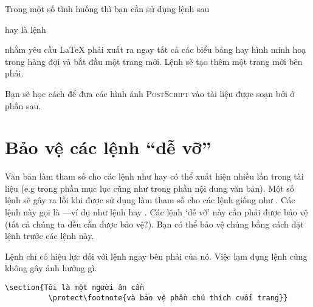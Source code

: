 Trong một số tình huống thì bạn cần sử dụng lệnh sau
\begin{lscommand}
 hay là lệnh 
\end{lscommand}
\noindent nhằm yêu cầu \LaTeX{} phải xuất ra ngay tất cả các biểu bảng hay hình minh hoạ trong hàng đợi và bắt đầu một trang mới. Lệnh  sẽ tạo thêm một trang mới bên phải.

Bạn sẽ học cách để đưa các hình ảnh \textsc{PostScript} vào tài liệu được soạn bởi \LaTeXe{} ở phần sau.

\section{Bảo vệ các lệnh ``dễ vỡ''}
Văn bản làm tham số cho các lệnh như  hay  có thể xuất hiện nhiều lần trong tài liệu (e.g trong phần mục lục cũng như trong phần nội dung văn bản). Một số lệnh sẽ gây ra lỗi khi được sử dụng làm tham số cho các lệnh giống như . Các lệnh này gọi là ---ví dụ như lệnh  hay . Các lệnh `dễ vỡ' này cần phải được bảo vệ (tất cả chúng ta đều cần được bảo vệ?). Bạn có thể bảo vệ chúng bằng cách đặt lệnh  trước các lệnh này.

Lệnh  chỉ có hiệu lực đối với lệnh ngay bên phải của nó. Việc lạm dụng lệnh  cũng không gây ảnh hưởng gì.
\begin{code}
\verb|\section{Tôi là một người ân cần|\\
\verb|          \protect\footnote{và bảo vệ phần chú thích cuối trang}}|
\end{code}
